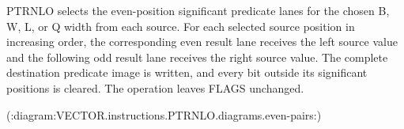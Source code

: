 PTRNLO selects the even-position significant predicate lanes for the chosen B, W, L, or Q width from each source.
For each selected source position in increasing order, the corresponding even result lane receives the left source value and the following odd result lane receives the right source value.
The complete destination predicate image is written, and every bit outside its significant positions is cleared.
The operation leaves FLAGS unchanged.

(:diagram:VECTOR.instructions.PTRNLO.diagrams.even-pairs:)
